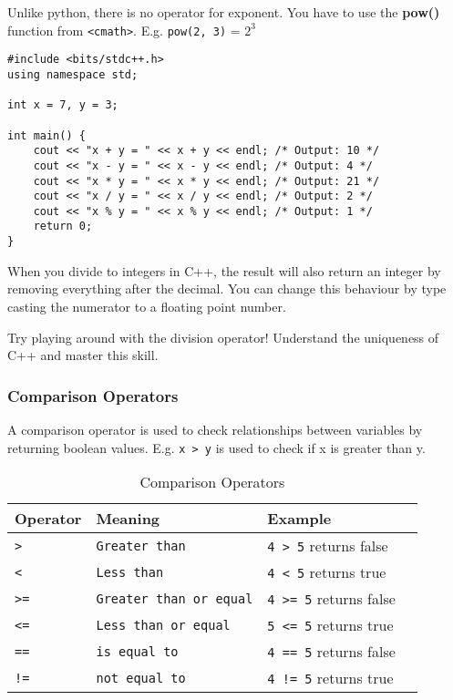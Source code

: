 \documentclass{report}
\begin{document}
\begin{note}
    Unlike python, there is no operator for exponent. You have to use the \textbf{pow()} function from \texttt{<cmath>}. E.g. \lstinline{pow(2, 3)} = $2^3$ 
\end{note}

\begin{lstlisting}[caption=Arithmetic Operators]
#include <bits/stdc++.h>
using namespace std;

int x = 7, y = 3;

int main() {
    cout << "x + y = " << x + y << endl; /* Output: 10 */ 
    cout << "x - y = " << x - y << endl; /* Output: 4 */ 
    cout << "x * y = " << x * y << endl; /* Output: 21 */ 
    cout << "x / y = " << x / y << endl; /* Output: 2 */ 
    cout << "x % y = " << x % y << endl; /* Output: 1 */ 
    return 0;
}
\end{lstlisting}

\begin{principle}
    When you divide to integers in C++, the result will also return an integer by removing everything after the decimal. You can change this behaviour by type casting the numerator to a floating point number.
\end{principle}

\begin{exercise}
    Try playing around with the division operator! Understand the uniqueness of C++ and master this skill.
\end{exercise}

\subsubsection{Comparison Operators}
A comparison operator is used to check relationships between variables by returning boolean values. E.g. \lstinline{x > y} is used to check if x is greater than y.

\begin{table}[ht]
    \centering
    \begin{center}
    \begin{tabular}{llll}
        \toprule
        Operator & Meaning & Example \\
        \midrule
        \texttt{>} & \texttt{Greater than} & \texttt{4 > 5} returns false\\
        \texttt{<} & \texttt{Less than}  & \texttt{4 < 5} returns true\\
        \texttt{>=} & \texttt{Greater than or equal}  & \texttt{4 >= 5} returns false\\
        \texttt{<=} & \texttt{Less than or equal}  & \texttt{5 <= 5} returns true\\
        \texttt{==} & \texttt{is equal to}  & \texttt{4 == 5} returns false\\
        \texttt{!=} & \texttt{not equal to}  & \texttt{4 != 5} returns true\\
        \bottomrule
    \end{tabular}
    \end{center}
    \caption{Comparison Operators}
    \label{tab:data-types}
\end{table}
\end{document}
